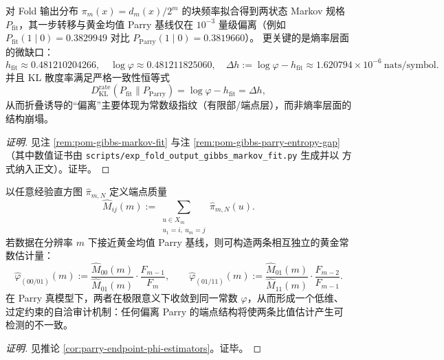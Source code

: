 



\begin{conclusion}\label{con:xi-terminal-fold-output-gibbs-parry-microbit-gap}
对 Fold 输出分布 \(\pi_m(x)=d_m(x)/2^m\) 的块频率拟合得到两状态 Markov 规格 \(P_{\mathrm{fit}}\)，其一步转移与黄金均值 Parry 基线仅在 \(10^{-3}\) 量级偏离（例如 \(P_{\mathrm{fit}}(1\mid 0)=0.3829949\) 对比 \(P_{\mathrm{Parry}}(1\mid 0)=0.3819660\)）。
更关键的是熵率层面的微缺口：
\[
h_{\mathrm{fit}}\approx 0.481210204266,\quad
\log\varphi\approx 0.481211825060,\quad
\Delta h:=\log\varphi-h_{\mathrm{fit}}\approx 1.620794\times 10^{-6}\ \text{nats/symbol}.
\]
并且 KL 散度率满足严格一致性恒等式
\[
D_{\mathrm{KL}}^{\mathrm{rate}}(P_{\mathrm{fit}}\|P_{\mathrm{Parry}})=\log\varphi-h_{\mathrm{fit}}=\Delta h,
\]
从而折叠诱导的“偏离”主要体现为常数级指纹（有限部/端点层），而非熵率层面的结构崩塌。
\end{conclusion}
\begin{proof}[证明]
见注 \ref{rem:pom-gibbs-markov-fit} 与注 \ref{rem:pom-gibbs-parry-entropy-gap}（其中数值证书由 \texttt{scripts/exp\_fold\_output\_gibbs\_markov\_fit.py} 生成并以 \texttt{\string} 方式纳入正文）。证毕。
\end{proof}

\begin{conclusion}\label{con:xi-terminal-parry-endpoint-mass-overdetermined-phi-audit}
以任意经验直方图 \(\hat\pi_{m,N}\) 定义端点质量
\[
\widehat M_{ij}(m):=\sum_{\substack{u\in X_m\\ u_1=i,\ u_m=j}}\hat\pi_{m,N}(u).
\]
若数据在分辨率 \(m\) 下接近黄金均值 Parry 基线，则可构造两条相互独立的黄金常数估计量：
\[
\widehat\varphi_{(00/01)}(m):=\frac{\widehat M_{00}(m)}{\widehat M_{01}(m)}\cdot \frac{F_{m-1}}{F_m},
\qquad
\widehat\varphi_{(01/11)}(m):=\frac{\widehat M_{01}(m)}{\widehat M_{11}(m)}\cdot \frac{F_{m-2}}{F_{m-1}}.
\]
在 Parry 真模型下，两者在极限意义下收敛到同一常数 \(\varphi\)，从而形成一个低维、过定约束的自洽审计机制：任何偏离 Parry 的端点结构将使两条比值估计产生可检测的不一致。
\end{conclusion}
\begin{proof}[证明]
见推论 \ref{cor:parry-endpoint-phi-estimators}。证毕。
\end{proof}

